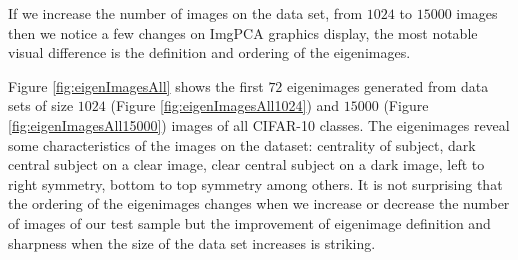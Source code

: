 \documentclass{article} %
\begin{document}
If we increase the number of images on the data set, from $1024$ to $15000$ images then we notice a few changes on ImgPCA graphics display, the most notable visual difference is the definition and ordering of the eigenimages.\par
Figure \ref{fig:eigenImagesAll} shows the first $72$ eigenimages generated from data sets of size $1024$ (Figure \ref{fig:eigenImagesAll1024}) and $15000$ (Figure \ref{fig:eigenImagesAll15000}) images of all CIFAR-10 classes. The eigenimages reveal some characteristics of the images on the dataset: centrality of subject, dark central subject on a clear image, clear central subject on a dark image, left to right symmetry, bottom to top symmetry among others. It is not surprising that the ordering of the eigenimages changes when we increase or decrease the number of images of our test sample but the improvement of eigenimage definition and sharpness when the size of the data set increases is striking.
\end{document}

